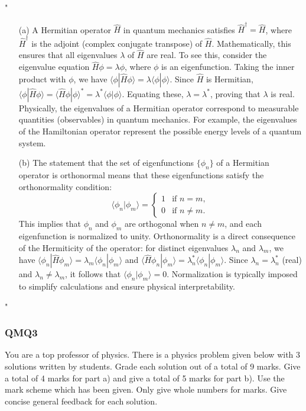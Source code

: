 "\begin{enumerate}
    \item[(a)] A Hermitian operator $\hat{H}$ in quantum mechanics satisfies $\hat{H}^\dagger = \hat{H}$, where $\hat{H}^\dagger$ is the adjoint (complex conjugate transpose) of $\hat{H}$. Mathematically, this ensures that all eigenvalues $\lambda$ of $\hat{H}$ are real. To see this, consider the eigenvalue equation $\hat{H} \phi = \lambda \phi$, where $\phi$ is an eigenfunction. Taking the inner product with $\phi$, we have $\langle \phi | \hat{H} \phi \rangle = \lambda \langle \phi | \phi \rangle$. Since $\hat{H}$ is Hermitian, $\langle \phi | \hat{H} \phi \rangle = \langle \hat{H} \phi | \phi \rangle^* = \lambda^* \langle \phi | \phi \rangle$. Equating these, $\lambda = \lambda^*$, proving that $\lambda$ is real. Physically, the eigenvalues of a Hermitian operator correspond to measurable quantities (observables) in quantum mechanics. For example, the eigenvalues of the Hamiltonian operator represent the possible energy levels of a quantum system.

    \item[(b)] The statement that the set of eigenfunctions $\{\phi_n\}$ of a Hermitian operator is orthonormal means that these eigenfunctions satisfy the orthonormality condition:
    \[
    \langle \phi_n | \phi_m \rangle = 
    \begin{cases} 
    1 & \text{if } n = m, \\
    0 & \text{if } n \neq m.
    \end{cases}
    \]
    This implies that $\phi_n$ and $\phi_m$ are orthogonal when $n \neq m$, and each eigenfunction is normalized to unity. Orthonormality is a direct consequence of the Hermiticity of the operator: for distinct eigenvalues $\lambda_n$ and $\lambda_m$, we have $\langle \phi_n | \hat{H} \phi_m \rangle = \lambda_m \langle \phi_n | \phi_m \rangle$ and $\langle \hat{H} \phi_n | \phi_m \rangle = \lambda_n^* \langle \phi_n | \phi_m \rangle$. Since $\lambda_n = \lambda_n^*$ (real) and $\lambda_n \neq \lambda_m$, it follows that $\langle \phi_n | \phi_m \rangle = 0$. Normalization is typically imposed to simplify calculations and ensure physical interpretability.
\end{enumerate}"


\subsubsection{QMQ3}

You are a top professor of physics. There is a physics problem given below with 3 solutions written by students. Grade each solution out of a total of 9 marks. Give a total of 4 marks for part a) and give a total of 5 marks for part b). Use the mark scheme which has been given. Only give whole numbers for marks. Give concise general feedback for each solution. 

